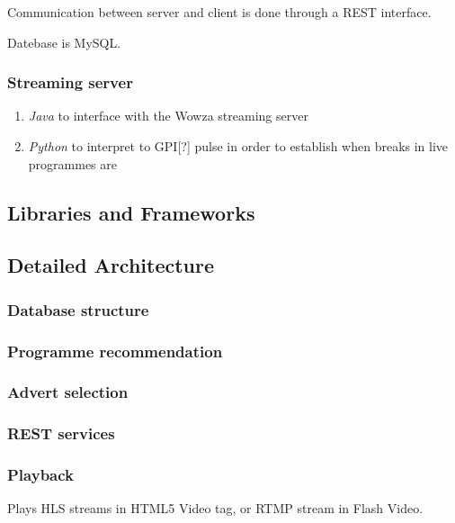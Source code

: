 Communication between server and client is done through a REST interface.

Datebase is MySQL.

\subsubsection{Streaming server}
\begin{enumerate}
\item \textit{Java} to interface with the Wowza streaming server
\item \textit{Python} to interpret to GPI[?] pulse in order to establish when breaks in live programmes are
\end{enumerate}

\subsection{Libraries and Frameworks}

\subsection{Detailed Architecture}

\subsubsection{Database structure}

\subsubsection{Programme recommendation}

\subsubsection{Advert selection}

\subsubsection{REST services}

\subsubsection{Playback}
Plays HLS streams in HTML5 Video tag, or RTMP stream in Flash Video.

